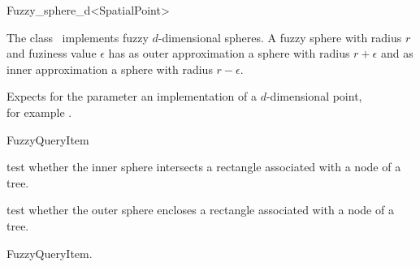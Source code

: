 

\begin{ccRefClass}{Fuzzy_sphere_d<SpatialPoint>}  %


\ccDefinition
  
The class \ccRefName\ implements fuzzy $d$-dimensional spheres.
A fuzzy sphere with radius $r$ and fuziness value $\epsilon$ has
as outer approximation a sphere with radius $r+\epsilon$ and
as inner approximation a sphere with radius $r-\epsilon$. 


\ccParameters

Expects for the parameter  an implementation of a $d$-dimensional point,\\
for example . 

\ccIsModel

FuzzyQueryItem

\ccTypes


\ccCreation
{}  %




\ccOperations


{test whether the inner sphere intersects a rectangle
associated with a node of a tree.}

{test whether the outer sphere encloses a rectangle
associated with a node of a tree.}

\ccSeeAlso

FuzzyQueryItem.

\end{ccRefClass}


